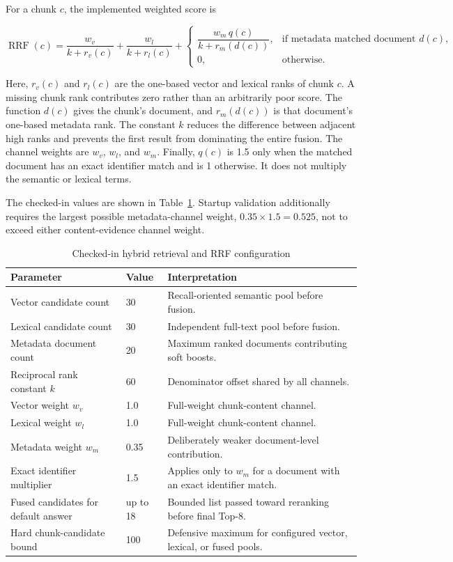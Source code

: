 For a chunk $c$, the implemented weighted score is

\begin{equation}
	\label{eq:weighted-rrf}
	\operatorname{RRF}(c) =
	\frac{w_v}{k+r_v(c)}
	+
	\frac{w_l}{k+r_l(c)}
	+
	\begin{cases}
	\dfrac{w_m\,q(c)}{k+r_m(d(c))}, & \text{if metadata matched document } d(c),\\[5pt]
	0, & \text{otherwise.}
	\end{cases}
\end{equation}

Here, $r_v(c)$ and $r_l(c)$ are the one-based vector and lexical ranks of chunk $c$. A missing chunk rank contributes zero rather than an arbitrarily poor score. The function $d(c)$ gives the chunk's document, and $r_m(d(c))$ is that document's one-based metadata rank. The constant $k$ reduces the difference between adjacent high ranks and prevents the first result from dominating the entire fusion. The channel weights are $w_v$, $w_l$, and $w_m$. Finally, $q(c)$ is 1.5 only when the matched document has an exact identifier match and is 1 otherwise. It does not multiply the semantic or lexical terms.

The checked-in values are shown in Table~\ref{tab:rrf-configuration}. Startup validation additionally requires the largest possible metadata-channel weight, $0.35\times1.5=0.525$, not to exceed either content-evidence channel weight.

\begin{table}[!htbp]
	\centering
	\caption{Checked-in hybrid retrieval and RRF configuration}
	\label{tab:rrf-configuration}
	\small
	\begin{tabular}{@{}p{5.1cm}p{2.5cm}p{6.5cm}@{}}
		\toprule
		Parameter & Value & Interpretation \\
		\midrule
		Vector candidate count & 30 & Recall-oriented semantic pool before fusion. \\
		Lexical candidate count & 30 & Independent full-text pool before fusion. \\
		Metadata document count & 20 & Maximum ranked documents contributing soft boosts. \\
		Reciprocal rank constant $k$ & 60 & Denominator offset shared by all channels. \\
		Vector weight $w_v$ & 1.0 & Full-weight chunk-content channel. \\
		Lexical weight $w_l$ & 1.0 & Full-weight chunk-content channel. \\
		Metadata weight $w_m$ & 0.35 & Deliberately weaker document-level contribution. \\
		Exact identifier multiplier & 1.5 & Applies only to $w_m$ for a document with an exact identifier match. \\
		Fused candidates for default answer & up to 18 & Bounded list passed toward reranking before final Top-8. \\
		Hard chunk-candidate bound & 100 & Defensive maximum for configured vector, lexical, or fused pools. \\
		\bottomrule
	\end{tabular}
\end{table}

